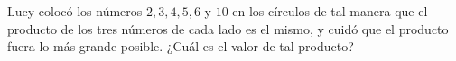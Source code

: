 Lucy colocó los números $2, 3, 4, 5, 6$ y $10$ en los círculos de tal manera que el producto de los tres números de cada lado es el mismo, y cuidó que el producto fuera lo más grande posible. ¿Cuál es el valor de tal producto?